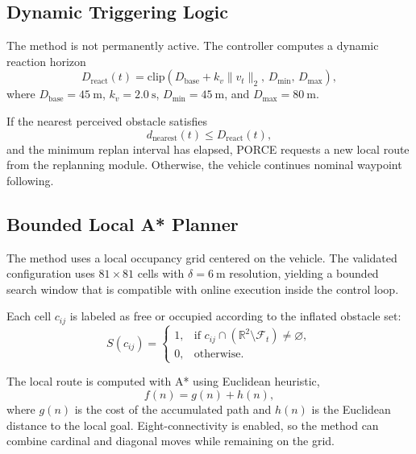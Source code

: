 \documentclass[journal,twoside,web]{ieeecolor}
\begin{document}
\subsection{Dynamic Triggering Logic}

The method is not permanently active. The controller computes a dynamic reaction horizon
\begin{equation}
    D_{\mathrm{react}}(t) =
    \mathrm{clip}\!\left(D_{\mathrm{base}} + k_v \lVert v_t \rVert_2,\,
    D_{\min},\, D_{\max}\right),
\end{equation}
where \(D_{\mathrm{base}}=\SI{45}{\meter}\), \(k_v=\SI{2.0}{\second}\), \(D_{\min}=\SI{45}{\meter}\), and \(D_{\max}=\SI{80}{\meter}\).

If the nearest perceived obstacle satisfies
\begin{equation}
    d_{\mathrm{nearest}}(t) \le D_{\mathrm{react}}(t),
\end{equation}
and the minimum replan interval has elapsed, PORCE requests a new local route from the replanning module. Otherwise, the vehicle continues nominal waypoint following.

\subsection{Bounded Local A* Planner}

The method uses a local occupancy grid centered on the vehicle. The validated configuration uses \(81 \times 81\) cells with \(\delta=\SI{6}{\meter}\) resolution, yielding a bounded search window that is compatible with online execution inside the control loop.

Each cell \(c_{ij}\) is labeled as free or occupied according to the inflated obstacle set:
\begin{equation}
    S(c_{ij}) =
    \begin{cases}
        1, & \text{if } c_{ij} \cap \left(\mathbb{R}^2 \setminus \mathcal{F}_t\right) \neq \varnothing,\\
        0, & \text{otherwise.}
    \end{cases}
\end{equation}

The local route is computed with A* \cite{hart1968formal} using Euclidean heuristic,
\begin{equation}
    f(n) = g(n) + h(n),
\end{equation}
where \(g(n)\) is the cost of the accumulated path and \(h(n)\) is the Euclidean distance to the local goal. Eight-connectivity is enabled, so the method can combine cardinal and diagonal moves while remaining on the grid.
\end{document}
